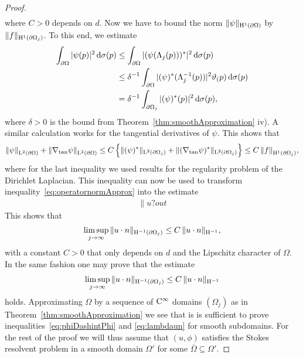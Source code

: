 \begin{proof}
{\begin{align}
  \end{align}
  where $C > 0$ depends on $d$.
  Now we have to bound the norm $\|\psi\|_{\mathrm{H}^1(\partial\Omega)}$ by $\|f\|_{\mathrm{H}^1(\partial\Omega_j)}$.
  To this end, we estimate
  \begin{align*}
    \int_{\partial\Omega} |\psi(p)|^2 \, {\operatorname{d}\!{\sigma}}(p)
    &\leq \int_{\partial\Omega} |(\psi(\Lambda_j(p)))^*|^2 \, {\operatorname{d}\!{\sigma}}(p) \\
    &\leq \delta^{-1} \int_{\partial\Omega} | (\psi)^*(\Lambda_j^{-1}(p))|^2 \vartheta_(p) \, {\operatorname{d}\!{\sigma}}(p) \\
    &= \delta^{-1} \int_{\partial\Omega_j} |(\psi)^*(p)|^2 \, {\operatorname{d}\!{\sigma}}(p) ,
  \end{align*}
  where $\delta > 0$ is the bound from Theorem~\ref{thm:smoothApproximation} iv).
  A similar calculation works for the tangential derivatives of $\psi$.
  This shows that
  \begin{align*}
    \|\psi\|_{\mathrm{L}^2(\partial\Omega)}^{} + \|\nabla_{\mathrm{tan}} \psi\|_{\mathrm{L}^2(\partial\Omega)}^{} 
    \leq C \, \Big\{ \|(\psi)^*\|_{\mathrm{L}^2(\partial\Omega_j)} + \| (\nabla_{\mathrm{tan}}\psi)^* \|_{\mathrm{L}^2(\partial\Omega_j)} \Big\} 
    \leq C \, \|f\|_{\mathrm{H}^1(\partial\Omega_j)}^{},
  \end{align*}
  where for the last inequality we used results for the regularity problem of the Dirichlet Laplacian.
  This inequality can now be used to transform inequality~\eqref{eq:operatornormApprox} into the estimate
  \begin{align*}
    \| u ?out
  \end{align*}
  This shows that
  \begin{align*}
    \limsup_{j \to \infty} \|u \cdot n\|_{\mathrm{H}^{-1}(\partial\Omega_j)} \leq C \, \|u \cdot n\|_{\mathrm{H}^{-1}},
  \end{align*}
  with a constant $C > 0$ that only depends on $d$ and the Lipschitz character of $\Omega$.
  In the same fashion one may prove that the estimate
  \begin{align*}
    \limsup_{j \to \infty} \|u \cdot n\|_{\mathrm{H}^{-1}(\partial\Omega_j)} \leq C \, \|u \cdot n\|_{\mathrm{H}^{-1}}
  \end{align*}
  holds.
}
  Approximating $\Omega$ by a sequence of $\mathrm{C}^\infty$ domains $(\Omega_j)$ as in Theorem~\ref{thm:smoothApproximation} we see that is is sufficient to prove inequalities~\eqref{eq:phiDashintPhi} and  \eqref{eq:lambdaun} for smooth subdomains.  
  For the rest of the proof we will thus assume that $(u,\phi)$ satisfies the Stokes resolvent problem in a smooth domain $\Omega'$ for some $\overline \Omega \subseteq \Omega'$.

\end{proof}
